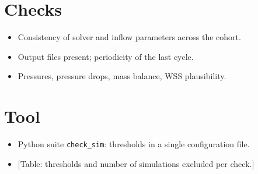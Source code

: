 \section{Checks}
\begin{itemize}
    \item Consistency of solver and inflow parameters across the cohort.
    \item Output files present; periodicity of the last cycle.
    \item Pressures, pressure drops, mass balance, WSS plausibility.
\end{itemize}

\section{Tool}
\begin{itemize}
    \item Python suite \texttt{check\_sim}: thresholds in a single configuration file.
    \item {[}Table: thresholds and number of simulations excluded per check.]
\end{itemize}
